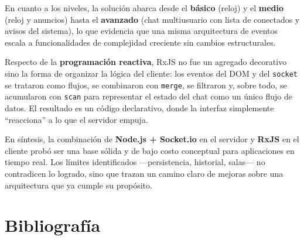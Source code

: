 \documentclass[12pt,a4paper]{article}
\begin{document}
En cuanto a los niveles, la solución abarca desde el \textbf{básico} (reloj) y el \textbf{medio} (reloj y anuncios) hasta el \textbf{avanzado} (chat multiusuario con lista de conectados y avisos del sistema), lo que evidencia que una misma arquitectura de eventos escala a funcionalidades de complejidad creciente sin cambios estructurales.

Respecto de la \textbf{programación reactiva}, RxJS no fue un agregado decorativo sino la forma de organizar la lógica del cliente: los eventos del DOM y del \texttt{socket} se trataron como flujos, se combinaron con \texttt{merge}, se filtraron y, sobre todo, se acumularon con \texttt{scan} para representar el estado del chat como un único flujo de datos. El resultado es un código declarativo, donde la interfaz simplemente ``reacciona'' a lo que el servidor empuja.

En síntesis, la combinación de \textbf{Node.js + Socket.io} en el servidor y \textbf{RxJS} en el cliente probó ser una base sólida y de bajo costo conceptual para aplicaciones en tiempo real. Los límites identificados —persistencia, historial, salas— no contradicen lo logrado, sino que trazan un camino claro de mejoras sobre una arquitectura que ya cumple su propósito.

\newpage
\section{Bibliografía}
\end{document}
